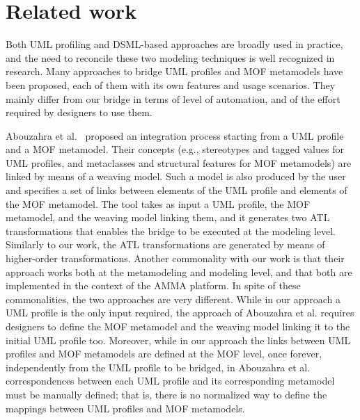 \section{Related work}\label{sec:related}

Both UML profiling and DSML-based approaches are broadly used in practice, and the need to reconcile these two
modeling techniques is well recognized in research. Many approaches to bridge UML profiles and MOF metamodels have been proposed, each of them with its own features and usage scenarios. They mainly differ from our bridge in terms of level of automation, and of the effort required by designers to use them.

Abouzahra et al.~\cite{Abouzahra} proposed an integration process starting from a UML profile and a MOF metamodel.
Their concepts (e.g., stereotypes and tagged values for UML profiles, and metaclasses and structural features for MOF metamodels)
are linked by means of a weaving model. Such a model is also produced by the user and specifies a set of links between elements
of the UML profile and elements of the MOF metamodel. The tool takes as input a UML profile, the MOF metamodel, and the weaving model linking them, and it generates two ATL transformations that enables the bridge to be executed at the modeling level. Similarly to our work, the ATL transformations are generated by means of higher-order transformations. Another commonality with our work is that their approach works both at the metamodeling and modeling level, and that both are implemented in the context of the AMMA platform. In spite of these commonalities, the two approaches are very different. While in our approach a UML profile is the only input required, the approach of Abouzahra et al. requires designers to define the MOF metamodel and the weaving model linking it to the initial UML profile too.
Moreover, while in our approach the links between UML profiles and MOF metamodels are defined at the MOF level, once forever, independently from the UML profile to be bridged, in Abouzahra et al. correspondences between each UML profile and its corresponding metamodel must be manually defined; that is, there is no normalized way to define the mappings between UML profiles and MOF metamodels.

